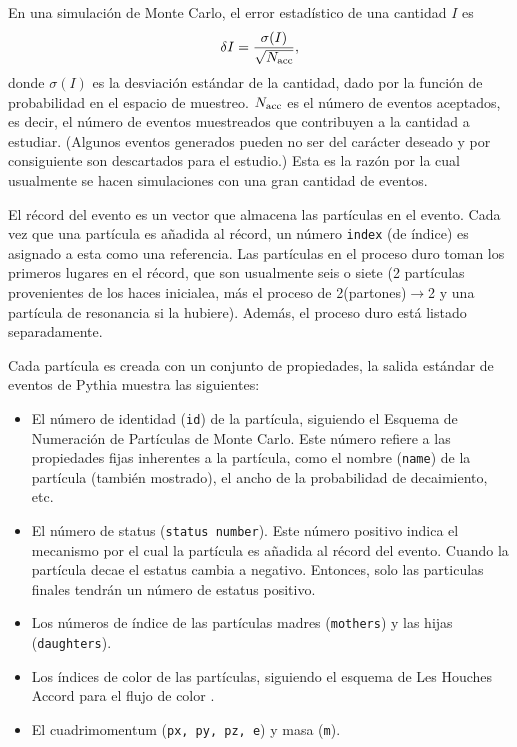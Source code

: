 \documentclass[a4paper,12pt]{article}
\begin{document}
En una simulación de Monte Carlo, el error estadístico de una cantidad $I$ es
$$
\delta I = \frac{\sigma (I)}{\sqrt {N_{\mathrm{acc}}}},
$$
donde $\sigma(I)$ es la desviación estándar de la cantidad, dado por la función de probabilidad en el espacio de muestreo. $N_{\mathrm{acc}}$ es el número de eventos aceptados, es decir, el número de eventos muestreados que contribuyen a la cantidad a estudiar. (Algunos eventos generados pueden no ser del carácter deseado y por consiguiente son descartados para el estudio.) Esta es la razón por la cual usualmente se hacen simulaciones con una gran cantidad de eventos.

El récord del evento es un vector que almacena las partículas en el evento. Cada vez que una partícula es añadida al récord, un número \verb|index| (de índice) es asignado a esta como una referencia. Las partículas en el proceso duro toman los primeros lugares en el récord, que son usualmente seis o siete (2 partículas provenientes de los haces inicialea, más el proceso de 2(partones)$\to$2 y una partícula de resonancia si la hubiere). Además, el proceso duro está listado separadamente.

Cada partícula es creada con un conjunto de propiedades, la salida estándar de eventos de Pythia muestra las siguientes:

\begin{itemize}
\item El número de identidad (\verb|id|) de la partícula, siguiendo el Esquema de Numeración de Partículas de Monte Carlo\cite{Beringer:1900zz}. Este número refiere a las propiedades fijas inherentes a la partícula, como el nombre (\verb|name|) de la partícula (también mostrado), el ancho de la probabilidad de decaimiento, etc.

\item El número de status (\verb|status number|). Este número positivo indica el mecanismo por el cual la partícula es añadida al récord del evento. Cuando la partícula decae el estatus cambia a negativo. Entonces, solo las particulas finales tendrán un número de estatus positivo.

\item Los números de índice de las partículas madres (\verb|mothers|) y las hijas (\verb|daughters|).

\item Los índices de color de las partículas, siguiendo el esquema de Les Houches Accord para el flujo de color \cite{Boos:2001cv}.

\item El cuadrimomentum (\verb|px, py, pz, e|) y masa (\verb|m|).
\end{itemize}
\end{document}
